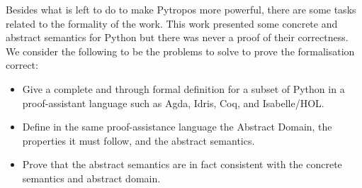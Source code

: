 Besides what is left to do to make Pytropos more powerful, there are some tasks related to
the formality of the work. This work presented some concrete and abstract semantics for
Python but there was never a proof of their correctness. We consider the following to be the
problems to solve to prove the formalisation correct:

\begin{itemize}
\tightlist
\item Give a complete and through formal definition for a subset of Python in a
  proof-assistant language such as Agda, Idris, Coq, and Isabelle/HOL.
\item Define in the same proof-assistance language the Abstract Domain, the properties it
  must follow, and the abstract semantics.
\item Prove that the abstract semantics are in fact consistent with the concrete semantics
  and abstract domain.
\end{itemize}


